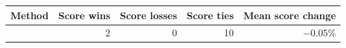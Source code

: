 \begin{tabular}{lrrrr}
\toprule
Method & Score wins & Score losses & Score ties & Mean score change \\
\midrule
\method{} & 2 & 0 & 10 & $-0.05\%$ \\
\bottomrule
\end{tabular}
